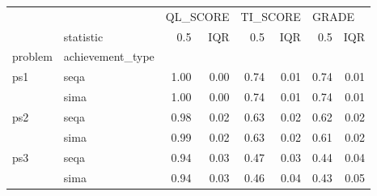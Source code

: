 \begin{tabular}{llrrrrrr}
\toprule
    & {} & \multicolumn{2}{l}{QL\_SCORE} & \multicolumn{2}{l}{TI\_SCORE} & \multicolumn{2}{l}{GRADE} \\
    & statistic &      0.5 &  IQR &      0.5 &  IQR &   0.5 &  IQR \\
problem & achievement\_type &          &      &          &      &       &      \\
\midrule
ps1 & seqa &     1.00 & 0.00 &     0.74 & 0.01 &  0.74 & 0.01 \\
    & sima &     1.00 & 0.00 &     0.74 & 0.01 &  0.74 & 0.01 \\
ps2 & seqa &     0.98 & 0.02 &     0.63 & 0.02 &  0.62 & 0.02 \\
    & sima &     0.99 & 0.02 &     0.63 & 0.02 &  0.61 & 0.02 \\
ps3 & seqa &     0.94 & 0.03 &     0.47 & 0.03 &  0.44 & 0.04 \\
    & sima &     0.94 & 0.03 &     0.46 & 0.04 &  0.43 & 0.05 \\
\bottomrule
\end{tabular}
